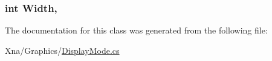 \subsubsection[{Width}]{\setlength{\rightskip}{0pt plus 5cm}int Width\hspace{0.3cm}{\ttfamily [get]}, {\ttfamily [set]}}\label{classMicrosoft_1_1Xna_1_1Framework_1_1Graphics_1_1DisplayMode_abbe7749c3b402f7dfe64f936774cfcd4}


The documentation for this class was generated from the following file\+:\begin{DoxyCompactItemize}
\item 
Xna/\+Graphics/\hyperlink{DisplayMode_8cs}{Display\+Mode.\+cs}\end{DoxyCompactItemize}
